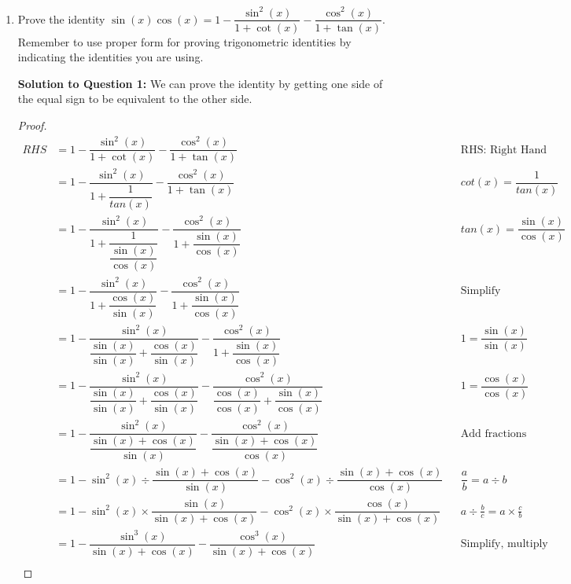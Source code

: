 \documentclass[12pt]{book}
\begin{document}
\begin{enumerate}

\item Prove the identity $\sin(x)\cos(x)=1-\dfrac{\sin^2(x)}{1+\cot(x)}-\dfrac{\cos^2(x)}{1+\tan(x)}$. Remember to use proper form for proving trigonometric identities by indicating the identities you are using.

\vspace{-0.4cm}
\textbf{Solution to Question 1:}
We can prove the identity by getting one side of the equal sign to be equivalent to the other side.
\vspace{-3cm}

\begin{proof}
\addtolength{\jot}{1em}
\begin{align*}
    RHS &= 1-\dfrac{\sin^2(x)}{1+\cot(x)}-\dfrac{\cos^2(x)}{1+\tan(x)} && \text{RHS: Right Hand Side} \\
    &= 1-\dfrac{\sin^2(x)}{1+\dfrac{1}{tan(x)}}-\dfrac{\cos^2(x)}{1+\tan(x)} && cot(x) = \dfrac{1}{tan(x)} \\
    &= 1-\dfrac{\sin^2(x)}{1+\dfrac{1}{\dfrac{\sin(x)}{\cos(x)}}}-\dfrac{\cos^2(x)}{1+\dfrac{\sin(x)}{\cos(x)}} && tan(x) = \dfrac{\sin(x)}{\cos(x)} \\
    &= 1-\dfrac{\sin^2(x)}{1+\dfrac{\cos(x)}{\sin(x)}}-\dfrac{\cos^2(x)}{1+\dfrac{\sin(x)}{\cos(x)}} && \text{Simplify} \\
    &= 1-\dfrac{\sin^2(x)}{\dfrac{\sin(x)}{\sin(x)} +\dfrac{\cos(x)}{\sin(x)}}-\dfrac{\cos^2(x)}{1+\dfrac{\sin(x)}{\cos(x)}} && 1 = \dfrac{\sin(x)}{\sin(x)} \\
    &= 1-\dfrac{\sin^2(x)}{\dfrac{\sin(x)}{\sin(x)} +\dfrac{\cos(x)}{\sin(x)}}-\dfrac{\cos^2(x)}{\dfrac{\cos(x)}{\cos(x)}+\dfrac{\sin(x)}{\cos(x)}} && 1 = \dfrac{\cos(x)}{\cos(x)} \\
    &= 1-\dfrac{\sin^2(x)}{\dfrac{\sin(x) + \cos(x)}{\sin(x)}}-\dfrac{\cos^2(x)}{\dfrac{\sin(x) + \cos(x)}{\cos(x)}} && \text{Add fractions together} \\
    &= 1-\sin^2(x) \div \dfrac{\sin(x) + \cos(x)}{\sin(x)} - \cos^2(x) \div \dfrac{\sin(x) + \cos(x)}{\cos(x)} && \dfrac{a}{b} = a \div b \\
    &= 1-\sin^2(x) \times \dfrac{\sin(x)}{\sin(x) + \cos(x)} - \cos^2(x) \times \dfrac{\cos(x)}{\sin(x) + \cos(x)} && a \div \frac{b}{c} = a \times \frac{c}{b} \\
    &= 1-\dfrac{\sin^3(x)}{\sin(x) + \cos(x)} - \dfrac{\cos^3(x)}{\sin(x) + \cos(x)} && \text{Simplify, multiply numerators} \\
\end{align*}


\end{proof}
\end{enumerate}
\end{document}
